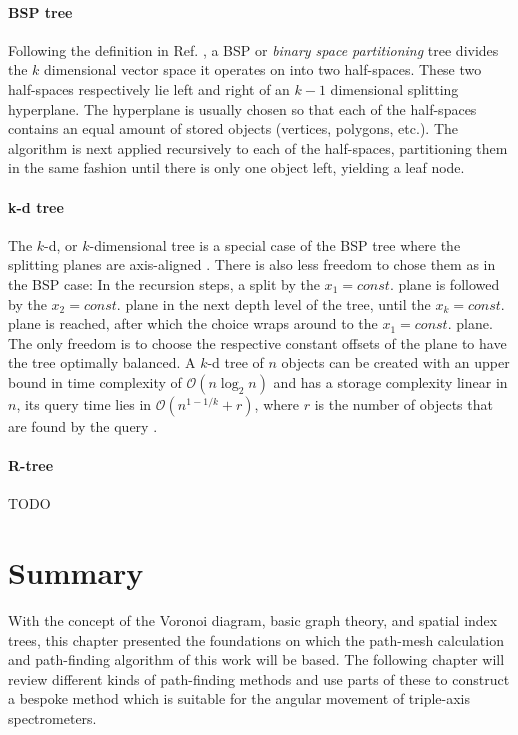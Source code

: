 \paragraph{BSP tree}
Following the definition in Ref. \cite[pp. 261-262]{Berg2008}, a BSP or \textit{binary space partitioning} 
tree divides the $k$ dimensional vector space it operates on into two half-spaces. 
These two half-spaces respectively lie left and right of 
an $k-1$ dimensional splitting hyperplane. The hyperplane is usually chosen so that each of the 
half-spaces contains an equal amount of stored objects (vertices, polygons, etc.). 
The algorithm is next applied recursively to each of the half-spaces, partitioning them in the same
fashion until there is only one object left, yielding a leaf node.


\paragraph{k-d tree}
The $k$-d, or $k$-dimensional tree is a special case of the BSP tree where the splitting planes are 
axis-aligned \cite[p. 278]{Berg2008}. 
There is also less freedom to chose them as in the BSP case: In the recursion steps, a split by 
the $x_1 = const.$ plane is followed by the $x_2 = const.$ plane in the next depth level of the tree,
until the $x_k = const.$ plane is reached, after which the choice wraps around to the
$x_1 = const.$ plane. The only freedom is to choose the respective constant offsets of the
plane to have the tree optimally balanced.
A $k$-d tree of $n$ objects can be created with an upper bound in time complexity of 
$\mathcal{O}\left( n \log_2 n \right)$ and has a storage complexity linear in $n$,
its query time lies in $\mathcal{O}\left( n^{1-1/k} + r \right)$, where $r$ is the number of
objects that are found by the query \cite[p. 105]{Berg2008}.


\paragraph{R-tree}
TODO



\section{Summary}
With the concept of the Voronoi diagram, basic graph theory, and spatial index trees, 
this chapter presented the foundations on which the path-mesh calculation and path-finding
algorithm of this work will be based. The following chapter will review different kinds
of path-finding methods and use parts of these to construct a bespoke method which
is suitable for the angular movement of triple-axis spectrometers.
